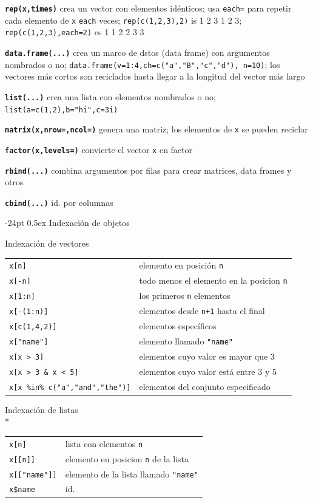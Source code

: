 \documentclass[10pt,landscape]{article}
\makeatletter
\renewcommand\section{\@startsection{section}{1}{0mm}%
                                     {-24pt}%
                                     {0.5ex}%
                                {\color[rgb]{1,0.54902,0}\normalfont\large\bfseries}}
\newcommand{\code}{\texttt}
\newcommand{\bcode}[1]{\texttt{\textbf{#1}}}
\makeatother
\begin{document}
\begin{multicols*}{3}
\bcode{rep(x,times)} crea un vector con elementos idénticos; usa \code{each=}
para repetir cada elemento de \code{x} \code{each} veces;
\code{rep(c(1,2,3),2)} is 1 2 3 1 2 3; \code{rep(c(1,2,3),each=2)} es 1 1 2 2 3 3 

\bcode{data.frame(...)} crea un marco de dstos (data frame) con argumentos nombrados o no; \code{data.frame(v=1:4,ch=c("a","B","c","d"),
	n=10)}; los vectores más cortos son reciclados hasta llegar a la longitud del vector más largo 

\bcode{list(...)} crea una lista con elementos nombrados o no;
  \code{list(a=c(1,2),b="hi",c=3i)} 

\bcode{matrix(x,nrow=,ncol=)} genera una matriz; los elementos de \code{x} se pueden reciclar

\bcode{factor(x,levels=)} convierte el vector \code{x} en factor

\bcode{rbind(...)} combina argumentos por filas para crear matrices, data frames y otros

\bcode{cbind(...)} id. por columnas



\section{Indexación de objetos}

Indexación de vectores

\begin{tabular}{@{}l@{\ }l}
\code{x[n]} & elemento en posición \code{n}\\
\code{x[-n]} & todo menos el elemento en la posicion \code{n}\\
\code{x[1:n]} & los primeros \code{n} elementos\\
\code{x[-(1:n)]} & elementos desde \code{n+1} hasta el final\\
\code{x[c(1,4,2)]} & elementos específicos\\
\code{x["name"]} & elemento llamado \code{"name"}\\
\code{x[x > 3]} & elementos cuyo valor es mayor que 3\\
\code{x[x > 3 \& x < 5]} & elementos cuyo valor está entre 3 y 5\\
\code{x[x \%in\% c("a","and","the")]} & elementos del conjunto especificado\\
\end{tabular}

Indexación de listas\\*
\samepage\begin{tabular}{@{}l@{\ }l}
\code{x[n]} & lista con elementos \code{n}\\
\code{x[[n]]} & elemento en posicion \code{n} de la lista\\
\code{x[["name"]]} & elemento de la lista llamado \code{"name"}\\
\code{x\$name} & id.\\
\end{tabular}


\end{multicols*}
\end{document}
